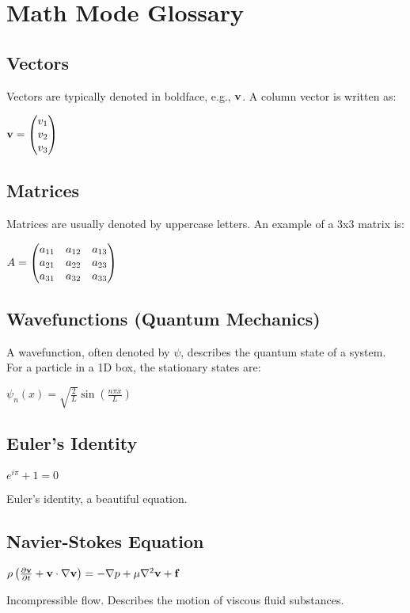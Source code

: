 \begingroup
\raggedright
\section{Math Mode Glossary}


\subsection{Vectors}
Vectors are typically denoted in boldface, e.g., $\mathbf{v}$. A column vector is written as:
\begin{formulabox}
$\mathbf{v} = \begin{pmatrix} v_1 \\ v_2 \\ v_3 \end{pmatrix}$
\end{formulabox}


\subsection{Matrices}
Matrices are usually denoted by uppercase letters. An example of a 3x3 matrix is:
\begin{formulabox}
$A = \begin{pmatrix} a_{11} & a_{12} & a_{13} \\ a_{21} & a_{22} & a_{23} \\ a_{31} & a_{32} & a_{33} \end{pmatrix}$
\end{formulabox}


\subsection{Wavefunctions (Quantum Mechanics)}
A wavefunction, often denoted by $\psi$, describes the quantum state of a system. For a particle in a 1D box, the stationary states are:
\begin{formulabox}
$\psi_n(x) = \sqrt{\frac{2}{L}} \sin\left(\frac{n\pi x}{L}\right)$
\end{formulabox}


\subsection{Euler's Identity}
\begin{formulabox}
    $e^{i\pi} + 1 = 0$
\end{formulabox}
Euler's identity, a beautiful equation.


\subsection{Navier-Stokes Equation}
\begin{formulabox}
    $\rho \left( \frac{\partial \mathbf{v}}{\partial t} + \mathbf{v} \cdot \nabla \mathbf{v} \right) = - \nabla p + \mu \nabla^2 \mathbf{v} + \mathbf{f}$
\end{formulabox}
Incompressible flow. Describes the motion of viscous fluid substances.


